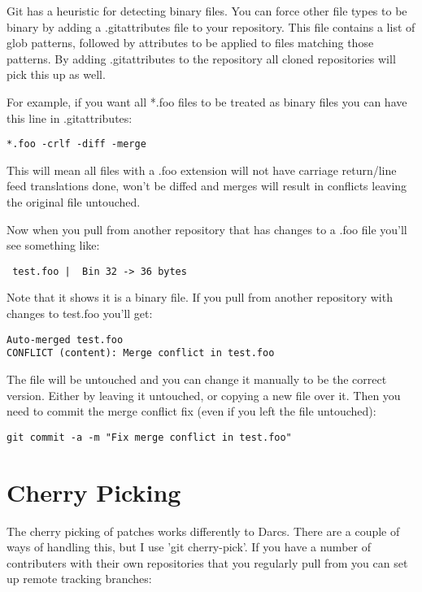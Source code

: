 Git has a heuristic for detecting binary files. You can force other
file types to be binary by adding a .gitattributes file to your
repository. This file contains a list of glob patterns, followed by
attributes to be applied to files matching those patterns. By adding
.gitattributes to the repository all cloned repositories will pick
this up as well.

For example, if you want all *.foo files to be treated as binary files
you can have this line in .gitattributes:

\begin{verbatim}
*.foo -crlf -diff -merge
\end{verbatim}

This will mean all files with a .foo extension will not have carriage
return/line feed translations done, won't be diffed and merges will
result in conflicts leaving the original file untouched.

Now when you pull from another repository that has changes to a .foo
file you'll see something like:

\begin{verbatim}
 test.foo |  Bin 32 -> 36 bytes
\end{verbatim}

Note that it shows it is a binary file. If you pull from another
repository with changes to test.foo you'll get:

\begin{verbatim}
Auto-merged test.foo
CONFLICT (content): Merge conflict in test.foo
\end{verbatim}

The file will be untouched and you can change it manually to be the
correct version. Either by leaving it untouched, or copying a new file
over it. Then you need to commit the merge conflict fix (even if you
left the file untouched):

\begin{verbatim}
git commit -a -m "Fix merge conflict in test.foo"
\end{verbatim}

\section{Cherry Picking}

The cherry picking of patches works differently to Darcs. There are a
couple of ways of handling this, but I use 'git cherry-pick'. If you
have a number of contributers with their own repositories that you
regularly pull from you can set up remote tracking branches:

